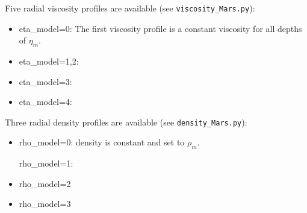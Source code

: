 
Five radial viscosity profiles are available (see {\tt viscosity\_Mars.py}):
\begin{itemize}
\item
{\python eta\_model=0}:
 The first viscosity profile is a constant viscosity for all depths of $\eta_m$. 

\item
{\python eta\_model=1,2}:

\item 
{\python eta\_model=3}:

\item
{\python eta\_model=4}:

\end{itemize}

Three radial density profiles are available (see {\tt density\_Mars.py}):

\begin{itemize}
\item
{\python rho\_model=0}: density is constant and set to $\rho_m$.

{\python rho\_model=1}:

\item
{\python rho\_model=2}

\item
{\python rho\_model=3}


\end{itemize}



